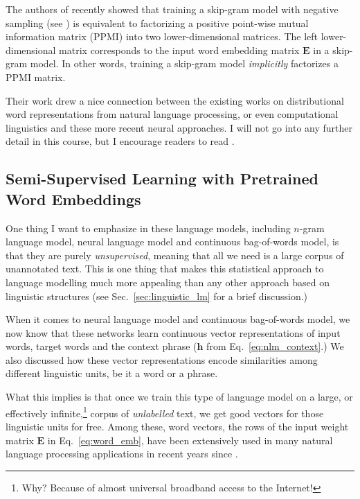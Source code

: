 \documentclass{report}
\newcommand{\vect}[1]{\mathbf{#1}}
\newcommand{\matr}[1]{\mathbf{#1}}
\newcommand{\vh}[0]{\vect{h}}
\newcommand{\mE}[0]{\matr{E}}
\begin{document}
The authors of \cite{Omer2014} recently showed that training a skip-gram model
with negative sampling (see \cite{mikolov2013efficient}) is equivalent to
factorizing a positive point-wise mutual information matrix (PPMI) into two
lower-dimensional matrices. The left lower-dimensional matrix corresponds to the
input word embedding matrix $\mE$ in a skip-gram model. In other words, training
a skip-gram model {\em implicitly} factorizes a PPMI matrix. 

Their work drew a nice connection between the existing works on distributional word
representations from natural language processing, or even computational
linguistics and these more recent neural approaches. I will not go into any
further detail in this course, but I encourage readers to read \cite{Omer2014}.


\subsection{Semi-Supervised Learning with Pretrained Word Embeddings}
\label{sec:semi_emb}

One thing I want to emphasize in these language models, including $n$-gram
language model, neural language model and continuous bag-of-words model, is that
they are purely {\em unsupervised}, meaning that all we need is a large corpus
of unannotated text. This is one thing that makes this statistical approach to
language modelling much more appealing than any other approach based on
linguistic structures (see Sec.~\ref{sec:linguistic_lm} for a brief discussion.) 

When it comes to neural language model and continuous bag-of-words model, we now
know that these networks learn continuous vector representations of input words,
target words and the context phrase ($\vh$ from Eq.~\eqref{eq:nlm_context}.) We
also discussed how these vector representations encode similarities among
different linguistic units, be it a word or a phrase. 

What this implies is that once we train this type of language model on a large,
or effectively infinite,\footnote{
    Why? Because of almost universal broadband access to the Internet!
}
corpus of {\em unlabelled} text, we get good vectors for those linguistic units
for free. Among these, word vectors, the rows of the input weight matrix $\mE$
in Eq.~\eqref{eq:word_emb}, have been extensively used in many natural language
processing applications in recent years since
\cite{turian2010word,collobert2011natural,mikolov2013efficient}.
\end{document}
